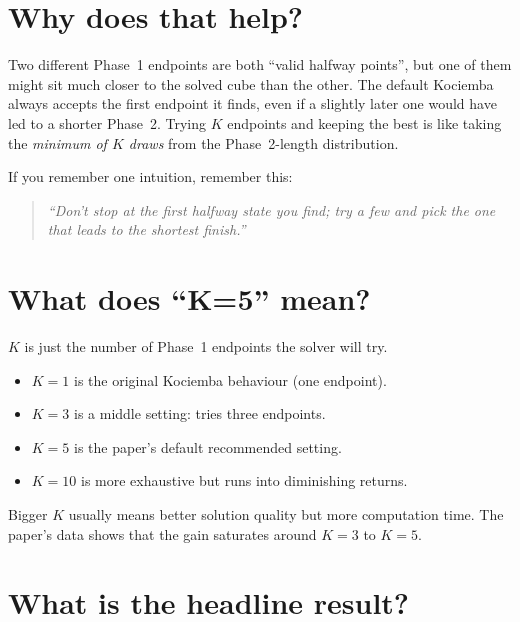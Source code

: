 \documentclass[11pt,a4paper]{article}
\newcommand{\qbox}[1]{\begin{quote}\small\textit{#1}\end{quote}}
\begin{document}
\section{Why does that help?}

Two different Phase~1 endpoints are both ``valid halfway points'', but
one of them might sit much closer to the solved cube than the other.
The default Kociemba always accepts the first endpoint it finds, even
if a slightly later one would have led to a shorter Phase~2. Trying $K$
endpoints and keeping the best is like taking the \emph{minimum of $K$
draws} from the Phase~2-length distribution.

If you remember one intuition, remember this:

\qbox{``Don't stop at the first halfway state you find; try a few and
pick the one that leads to the shortest finish.''}

\section{What does ``K=5'' mean?}

$K$ is just the number of Phase~1 endpoints the solver will try.

\begin{itemize}[leftmargin=2em]
  \item $K=1$ is the original Kociemba behaviour (one endpoint).
  \item $K=3$ is a middle setting: tries three endpoints.
  \item $K=5$ is the paper's default recommended setting.
  \item $K=10$ is more exhaustive but runs into diminishing returns.
\end{itemize}

Bigger $K$ usually means better solution quality but more computation
time. The paper's data shows that the gain saturates around $K=3$ to
$K=5$.

\section{What is the headline result?}
\label{sec:headline}
\end{document}
